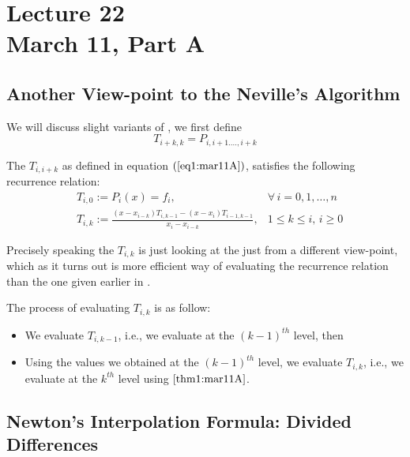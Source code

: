 \chapter*{Lecture 22 \\ March 11, Part A}
\setcounter{chapter}{22}
\setcounter{section}{0}
\setcounter{equation}{0}

\section{Another View-point to the Neville's Algorithm}
We will discuss slight variants of , we first define 
\begin{equation}\label{eq1:mar11A}
    T_{i+k,k} = P_{i,i+1.\dots,i+k}
\end{equation}

\begin{thm}\label{thm1:mar11A}
    The $T_{i,i+k}$ as defined in equation $(\ref{eq1:mar11A})$, satisfies the following recurrence relation:
    \begin{align*}
        &T_{i,0} := P_i(x) = f_i, &\forall \, i = 0,1,\dots,n \\ 
        &T_{i,k} := \frac{(x-x_{i-k})T_{i,k-1} - (x-x_i)T_{i-1,k-1}}{x_i - x_{i-k}}, &1 \leq k \leq i, \, i \geq 0 
    \end{align*}
\end{thm}

Precisely speaking the $T_{i,k}$ is just looking at the  just from a different view-point, which as it turns out is more efficient way of evaluating the recurrence relation than the one given earlier in .

The process of evaluating $T_{i,k}$ is as follow:
\begin{itemize}
    \item We evaluate $T_{i,k-1}$, i.e., we evaluate at the $(k-1)^{th}$ level, then
    \item Using the values we obtained at the $(k-1)^{th}$ level, we evaluate $T_{i,k}$, i.e., we evaluate at the $k^{th}$ level using  $\ref{thm1:mar11A}$.
\end{itemize}

\section{Newton's Interpolation Formula: Divided Differences}

